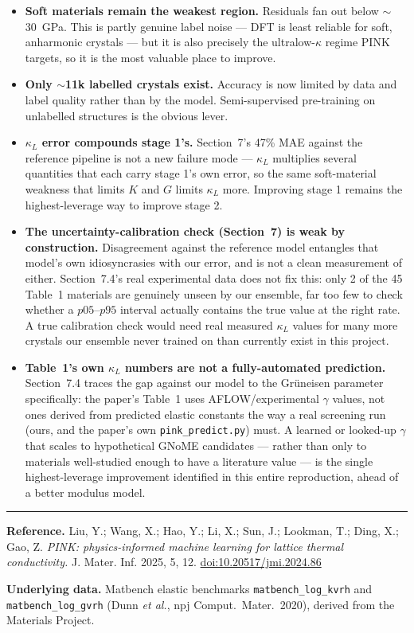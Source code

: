 \documentclass[11pt,a4paper]{article}
\begin{document}
\begin{itemize}\setlength{\itemsep}{4pt}
\item \textbf{Soft materials remain the weakest region.} Residuals fan out below
$\sim$30~GPa. This is partly genuine label noise --- DFT is least reliable for
soft, anharmonic crystals --- but it is also precisely the ultralow-$\kappa$
regime PINK targets, so it is the most valuable place to improve.
\item \textbf{Only $\sim$11k labelled crystals exist.} Accuracy is now limited
by data and label quality rather than by the model. Semi-supervised pre-training
on unlabelled structures is the obvious lever.
\item \textbf{$\kappa_L$ error compounds stage 1's.} Section~7's 47\% MAE against
the reference pipeline is not a new failure mode --- $\kappa_L$ multiplies
several quantities that each carry stage 1's own error, so the same
soft-material weakness that limits $K$ and $G$ limits $\kappa_L$ more.
Improving stage 1 remains the highest-leverage way to improve stage 2.
\item \textbf{The uncertainty-calibration check (Section~7) is weak by
construction.} Disagreement against the reference model entangles that
model's own idiosyncrasies with our error, and is not a clean measurement of
either. Section~7.4's real experimental data does not fix this: only 2 of the
45 Table~1 materials are genuinely unseen by our ensemble, far too few to
check whether a $p05$--$p95$ interval actually contains the true value at the
right rate. A true calibration check would need real measured $\kappa_L$
values for many more crystals our ensemble never trained on than currently
exist in this project.
\item \textbf{Table~1's own $\kappa_L$ numbers are not a fully-automated
prediction.} Section~7.4 traces the gap against our model to the Gr\"uneisen
parameter specifically: the paper's Table~1 uses AFLOW/experimental
$\gamma$ values, not ones derived from predicted elastic constants the way a
real screening run (ours, and the paper's own \texttt{pink\_predict.py})
must. A learned or looked-up $\gamma$ that scales to hypothetical GNoME
candidates --- rather than only to materials well-studied enough to have a
literature value --- is the single highest-leverage improvement identified
in this entire reproduction, ahead of a better modulus model.
\end{itemize}

\vspace{0.6cm}
\hrule
\vspace{0.3cm}
\noindent\small
\textbf{Reference.} Liu, Y.; Wang, X.; Hao, Y.; Li, X.; Sun, J.; Lookman, T.;
Ding, X.; Gao, Z. \textit{PINK: physics-informed machine learning for lattice
thermal conductivity.} J. Mater. Inf. 2025, 5, 12.
\href{https://dx.doi.org/10.20517/jmi.2024.86}{doi:10.20517/jmi.2024.86}

\noindent
\textbf{Underlying data.} Matbench elastic benchmarks
\texttt{matbench\_log\_kvrh} and \texttt{matbench\_log\_gvrh} (Dunn \textit{et
al.}, npj Comput.\ Mater.\ 2020), derived from the Materials Project.
\end{document}
